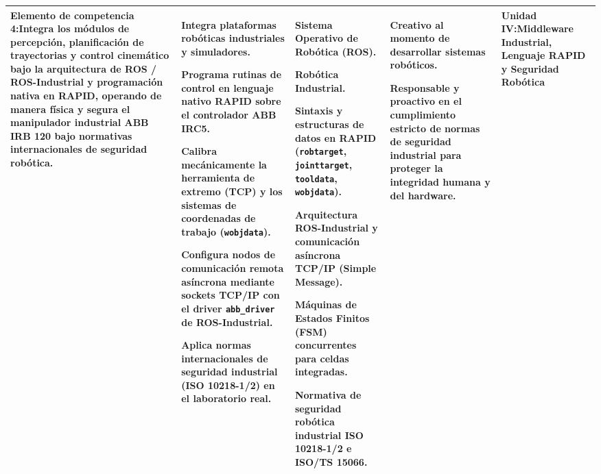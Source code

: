 \documentclass[11pt, letterpaper]{article}
\begin{document}
\begin{xltabular}{\textwidth}{|>{\raggedright\arraybackslash}p{3.5cm}|>{\raggedright\arraybackslash}X|>{\raggedright\arraybackslash}X|>{\raggedright\arraybackslash}X|>{\centering\arraybackslash}p{2.5cm}|}
\textbf{Elemento de competencia 4:}\newline Integra los módulos de percepción, planificación de trayectorias y control cinemático bajo la arquitectura de ROS / ROS-Industrial y programación nativa en RAPID, operando de manera física y segura el manipulador industrial ABB IRB 120 bajo normativas internacionales de seguridad robótica.
& \begin{tabitemize}
    \item Integra plataformas robóticas industriales y simuladores.
    \item Programa rutinas de control en lenguaje nativo RAPID sobre el controlador ABB IRC5.
    \item Calibra mecánicamente la herramienta de extremo (TCP) y los sistemas de coordenadas de trabajo (\texttt{wobjdata}).
    \item Configura nodos de comunicación remota asíncrona mediante sockets TCP/IP con el driver \texttt{abb\_driver} de ROS-Industrial.
    \item Aplica normas internacionales de seguridad industrial (ISO 10218-1/2) en el laboratorio real.
\end{tabitemize}
& \begin{tabitemize}
    \item Sistema Operativo de Robótica (ROS).
    \item Robótica Industrial.
    \item Sintaxis y estructuras de datos en RAPID (\texttt{robtarget}, \texttt{jointtarget}, \texttt{tooldata}, \texttt{wobjdata}).
    \item Arquitectura ROS-Industrial y comunicación asíncrona TCP/IP (Simple Message).
    \item Máquinas de Estados Finitos (FSM) concurrentes para celdas integradas.
    \item Normativa de seguridad robótica industrial ISO 10218-1/2 e ISO/TS 15066.
\end{tabitemize}
& \begin{tabitemize}
    \item Creativo al momento de desarrollar sistemas robóticos.
    \item Responsable y proactivo en el cumplimiento estricto de normas de seguridad industrial para proteger la integridad humana y del hardware.
\end{tabitemize}
& Unidad IV:\newline Middleware Industrial, Lenguaje RAPID y Seguridad Robótica
\\ \hline

\end{xltabular}
\normalsize
\end{document}

